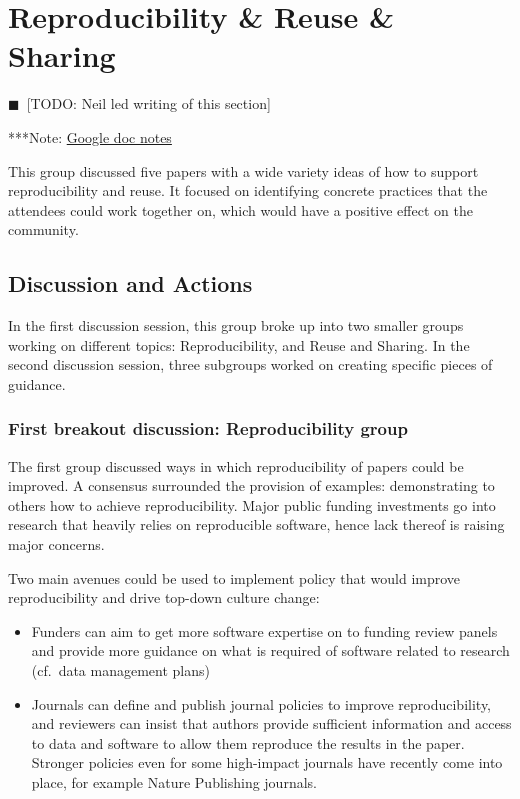 \documentclass[11pt, oneside]{amsart}
\newcommand{\todo}[1]{{\color{blue}$\blacksquare$~\textsf{[TODO: #1]}}}
\newcommand{\note}[1]{ {\textcolor{blueish}    { ***Note:      #1 }}}
\begin{document}
\section{Reproducibility \& Reuse \& Sharing} \label{sec:reproduce}
\todo{Neil led writing of this section}

\note{\href{http://tinyurl.com/kqpe87z}{Google doc notes}}

This group discussed five papers with a wide variety ideas of how to support
reproducibility and reuse. It focused on identifying concrete practices that the attendees
could work together on, which would have a positive effect on the community.

\subsection{Discussion and Actions}

In the first discussion session, this group broke up into two smaller groups
working on different topics: Reproducibility, and Reuse and Sharing. In the
second discussion session, three subgroups worked on creating specific pieces of
guidance.

\subsubsection{First breakout discussion: Reproducibility group}

The first group discussed ways in which reproducibility of papers could be
improved. A consensus surrounded the provision of examples: demonstrating to
others how to achieve reproducibility. Major public funding investments go into
research that heavily relies on reproducible software, hence lack thereof
is raising major concerns.

Two main avenues could be used to implement policy that would improve
reproducibility and drive top-down culture change:
\begin{itemize}
\item Funders can aim to get more software expertise on to funding review panels
and provide more guidance on what is required of software related to research
(cf.\ data management plans)

\item Journals can define and publish journal policies to improve
reproducibility, and reviewers can insist that authors provide sufficient
information and access to data and software to allow them reproduce the results
in the paper. Stronger policies even for some high-impact journals have recently
come into place, for example Nature Publishing journals.
\end{itemize}
\end{document}
